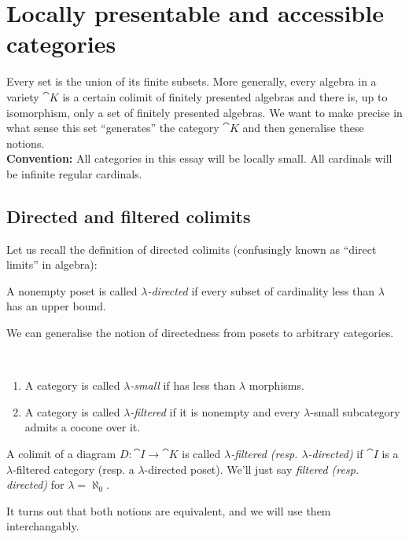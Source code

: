 \section{Locally presentable and accessible categories}
\label{sec:presentableaccessible}

Every set is the union of its finite subsets. More generally, every algebra in a variety $\cat K$ is a certain colimit of finitely presented algebras and there is, up to isomorphism, only a set of finitely presented algebras. We want to make precise in what sense this set ``generates'' the category $\cat K$ and then generalise these notions. \\

\textbf{Convention: } All categories in this essay will be locally small. All cardinals will be infinite regular cardinals.

\subsection{Directed and filtered colimits}

Let us recall the definition of directed colimits (confusingly known as ``direct limits'' in algebra):
\begin{Definition}
A nonempty poset is called \emph{$\lambda$-directed} if every subset of cardinality less than $\lambda$ has an upper bound.
\end{Definition}

We can generalise the notion of directedness from posets to arbitrary categories.

\begin{Definition}\
\begin{enumerate}
\item A category is called \emph{$\lambda$-small} if has less than $\lambda$ morphisms.
\item A category is called \emph{$\lambda$-filtered} if it is nonempty and every $\lambda$-small subcategory admits a cocone over it. 
\end{enumerate}
A colimit of a diagram $D : \cat I \to \cat K$ is called \emph{$\lambda$-filtered (resp. $\lambda$-directed)} if $\cat I$ is a $\lambda$-filtered category (resp. a $\lambda$-directed poset). We'll just say \emph{filtered (resp. directed)} for $\lambda = \aleph_0$.
\end{Definition}

It turns out that both notions are equivalent, and we will use them interchangably.

